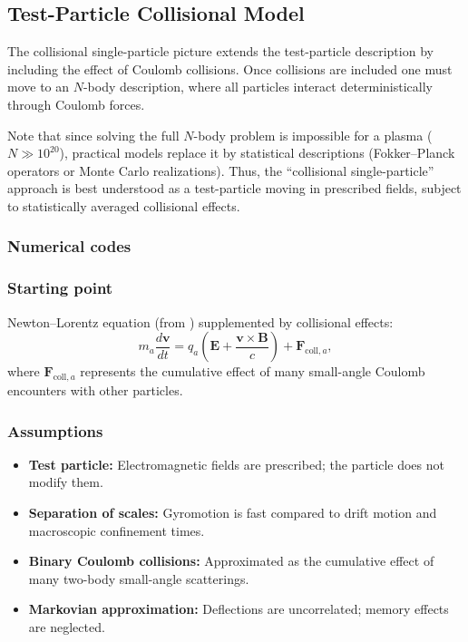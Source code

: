 \documentclass[10pt]{book}
\begin{document}
\subsection{Test-Particle Collisional Model}

The collisional single-particle picture extends the test-particle description by including the effect of Coulomb collisions. 
Once collisions are included one must move to an $N$-body description, where all particles interact deterministically through Coulomb forces. 

Note that since solving the full $N$-body problem is impossible for a plasma ($N \gg 10^{20}$), practical models replace it by statistical descriptions (Fokker--Planck operators or Monte Carlo realizations). 
Thus, the ``collisional single-particle'' approach is best understood as a test-particle moving in prescribed fields, subject to statistically averaged collisional effects.

\subsubsection{Numerical codes}

\subsubsection{Starting point}
Newton–Lorentz equation (from ) supplemented by collisional effects:
\begin{equation}
  m_a \frac{d\mathbf{v}}{dt} = q_a \left( \mathbf{E} + \frac{\mathbf{v}\times \mathbf{B}}{c} \right) + \mathbf{F}_{\text{coll},a},
\end{equation}
where $\mathbf{F}_{\text{coll},a}$ represents the cumulative effect of many small-angle Coulomb encounters with other particles.

\subsubsection{Assumptions}
\begin{itemize}
    \item \textbf{Test particle:} Electromagnetic fields are prescribed; the particle does not modify them.
    \item \textbf{Separation of scales:} Gyromotion is fast compared to drift motion and macroscopic confinement times.
    \item \textbf{Binary Coulomb collisions:} Approximated as the cumulative effect of many two-body small-angle scatterings.
    \item \textbf{Markovian approximation:} Deflections are uncorrelated; memory effects are neglected.
\end{itemize}
\end{document}
